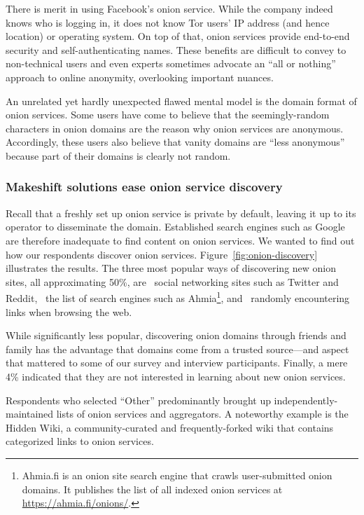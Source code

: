 There is merit in using Facebook's onion service.  While the company indeed
knows who is logging in, it does not know Tor users' IP address (and hence
location) or operating system.  On top of that, onion services provide
end-to-end security and self-authenticating names.  These benefits are difficult
to convey to non-technical users and even experts sometimes advocate an ``all or
nothing'' approach to online anonymity, overlooking important nuances.

An unrelated yet hardly unexpected flawed mental model is the domain format of
onion services.  Some users have come to believe that the seemingly-random
characters in onion domains are the reason why onion services are anonymous.
Accordingly, these users also believe that vanity domains are ``less anonymous''
because part of their domains is clearly not random.

\subsubsection{Makeshift solutions ease onion service discovery}

Recall that a freshly set up onion service is private by default, leaving it up
to its operator to disseminate the domain.  Established search engines such as
Google are therefore inadequate to find content on onion services.  We wanted to
find out how our respondents discover onion services.
Figure~\ref{fig:onion-discovery} illustrates the results.  The three most
popular ways of discovering new onion sites, all approximating 50\%, are
\first~social networking sites such as Twitter and Reddit, \second~the list of
search engines such as Ahmia\footnote{Ahmia.fi is an onion site search engine
that crawls user-submitted onion domains.  It publishes the list of all indexed
onion services at \url{https://ahmia.fi/onions/}.}, and \third~randomly
encountering links when browsing the web.

While significantly less popular, discovering onion domains through friends and
family has the advantage that domains come from a trusted source---and aspect
that mattered to some of our survey and interview participants.  Finally, a mere
4\% indicated that they are not interested in learning about new onion services.

Respondents who selected ``Other'' predominantly brought up
independently-maintained lists of onion services and aggregators.  A noteworthy
example is the Hidden Wiki, a community-curated and frequently-forked wiki that
contains categorized links to onion services.

